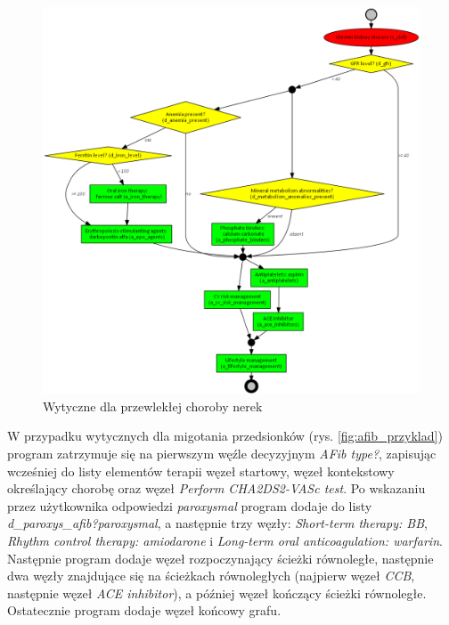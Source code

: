 \begin{figure}[H]
\centering
\includegraphics[scale=0.4]{img/ckd-simplified-ver-5_przyklad.png}
\caption{Wytyczne dla przewlekłej choroby nerek}
\label{fig:ckd_przyklad}
\end{figure}

W przypadku wytycznych dla migotania przedsionków (rys. \ref{fig:afib_przyklad}) program zatrzymuje się na pierwszym węźle decyzyjnym \textit{AFib type?}, zapisując wcześniej do listy elementów terapii węzeł startowy, węzeł kontekstowy określający chorobę oraz węzeł \textit{Perform CHA2DS2-VASc test}. Po wskazaniu przez użytkownika odpowiedzi \textit{paroxysmal} program dodaje do listy \textit{d\_paroxys\_afib?paroxysmal}, a następnie trzy węzły: \textit{Short-term therapy: BB}, \textit{Rhythm control therapy: amiodarone} i \textit{Long-term oral anticoagulation: warfarin}. Następnie program dodaje węzeł rozpoczynający ścieżki równoległe, następnie dwa węzły znajdujące się na ścieżkach równoległych (najpierw węzeł \textit{CCB}, następnie węzeł \textit{ACE inhibitor}), a później węzeł kończący ścieżki równoległe. Ostatecznie program dodaje węzeł końcowy grafu. 

